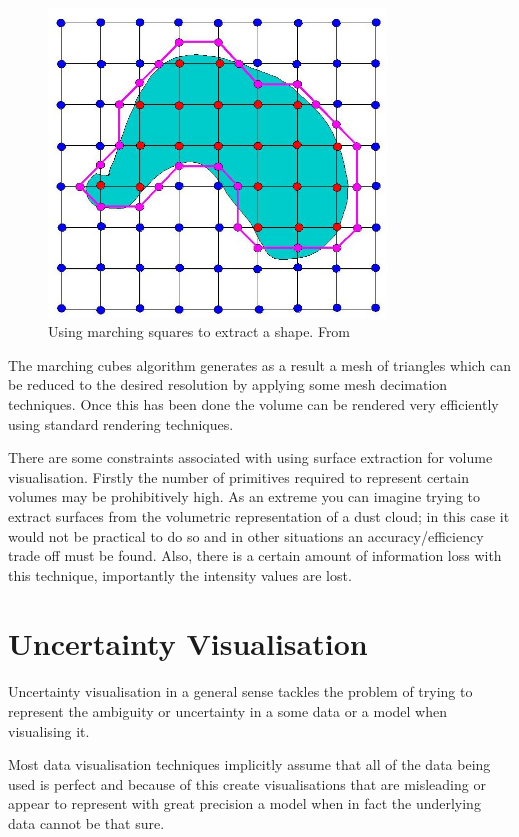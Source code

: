 \begin{figure}[h]
    \centering
	\includegraphics[width=0.8\textwidth]{images/marching_squares.jpg}
    \caption{Using marching squares to extract a shape. From \cite{marching_squares:image}}
    \label{fig:marching_squares}
\end{figure}

The marching cubes algorithm generates as a result a mesh of triangles which can be reduced to the desired resolution by applying some mesh decimation techniques. Once this has been done the volume can be rendered very efficiently using standard rendering techniques.

There are some constraints associated with using surface extraction for volume visualisation. Firstly the number of primitives required to represent certain volumes may be prohibitively high. As an extreme you can imagine trying to extract surfaces from the volumetric representation of a dust cloud; in this case it would not be practical to do so and in other situations an accuracy/efficiency trade off must be found. Also, there is a certain amount of information loss with this technique, importantly the intensity values are lost.

\newpage
\section{Uncertainty Visualisation}
\cite{uncertaintyoverview}
Uncertainty visualisation in a general sense tackles the problem of trying to represent the ambiguity or uncertainty in a some data or a model when visualising it.

Most data visualisation techniques implicitly assume that all of the data being used is perfect and because of this create visualisations that are misleading or appear to represent with great precision a model when in fact the underlying data cannot be that sure.

